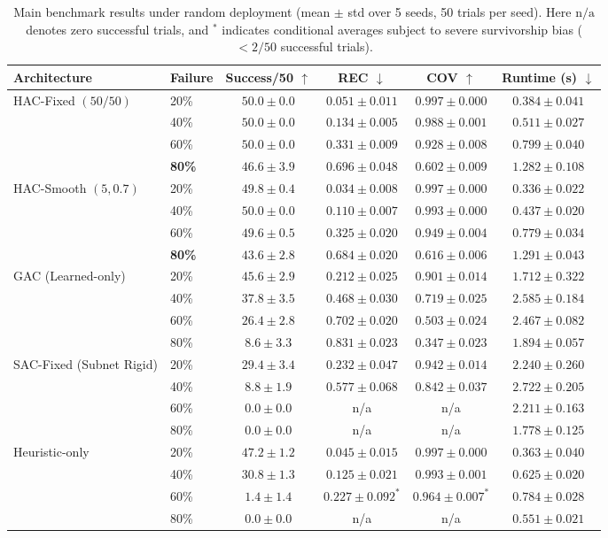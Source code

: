\documentclass[11pt]{article}
\theoremstyle{plain}
\theoremstyle{definition}
\theoremstyle{remark}
\begin{document}
\begin{table}[t]
\centering
\caption{Main benchmark results under random deployment (mean $\pm$ std over 5 seeds, 50 trials per seed). Here $\mathrm{n/a}$ denotes zero successful trials, and $^*$ indicates conditional averages subject to severe survivorship bias ($<2/50$ successful trials).}
\label{tab:main-random}
\scriptsize
\begin{tabular}{@{}llcccc@{}}
\toprule
Architecture & Failure & Success/50 $\uparrow$ & REC $\downarrow$ & COV $\uparrow$ & Runtime (s) $\downarrow$ \\
\midrule
\multirow{4}{*}{HAC-Fixed $(50/50)$}
 & 20\% & $50.0\pm0.0$ & $0.051\pm0.011$ & $0.997\pm0.000$ & $0.384\pm0.041$ \\
 & 40\% & $50.0\pm0.0$ & $0.134\pm0.005$ & $0.988\pm0.001$ & $0.511\pm0.027$ \\
 & 60\% & $50.0\pm0.0$ & $0.331\pm0.009$ & $0.928\pm0.008$ & $0.799\pm0.040$ \\
 & \textbf{80\%} & $\mathbf{46.6\pm3.9}$ & $0.696\pm0.048$ & $0.602\pm0.009$ & $\mathbf{1.282\pm0.108}$ \\
\midrule
\multirow{4}{*}{HAC-Smooth $(5, 0.7)$}
 & 20\% & $49.8\pm0.4$ & $0.034\pm0.008$ & $0.997\pm0.000$ & $0.336\pm0.022$ \\
 & 40\% & $50.0\pm0.0$ & $0.110\pm0.007$ & $0.993\pm0.000$ & $0.437\pm0.020$ \\
 & 60\% & $49.6\pm0.5$ & $0.325\pm0.020$ & $0.949\pm0.004$ & $0.779\pm0.034$ \\
 & \textbf{80\%} & $43.6\pm2.8$ & $\mathbf{0.684\pm0.020}$ & $\mathbf{0.616\pm0.006}$ & $1.291\pm0.043$ \\
\midrule
\multirow{4}{*}{GAC (Learned-only)}
 & 20\% & $45.6\pm2.9$ & $0.212\pm0.025$ & $0.901\pm0.014$ & $1.712\pm0.322$ \\
 & 40\% & $37.8\pm3.5$ & $0.468\pm0.030$ & $0.719\pm0.025$ & $2.585\pm0.184$ \\
 & 60\% & $26.4\pm2.8$ & $0.702\pm0.020$ & $0.503\pm0.024$ & $2.467\pm0.082$ \\
 & 80\% & $8.6\pm3.3$  & $0.831\pm0.023$ & $0.347\pm0.023$ & $1.894\pm0.057$ \\
\midrule
\multirow{4}{*}{SAC-Fixed (Subnet Rigid)}
 & 20\% & $29.4\pm3.4$ & $0.232\pm0.047$ & $0.942\pm0.014$ & $2.240\pm0.260$ \\
 & 40\% & $8.8\pm1.9$  & $0.577\pm0.068$ & $0.842\pm0.037$ & $2.722\pm0.205$ \\
 & 60\% & $0.0\pm0.0$  & n/a & n/a & $2.211\pm0.163$ \\
 & 80\% & $0.0\pm0.0$  & n/a & n/a & $1.778\pm0.125$ \\
\midrule
\multirow{4}{*}{Heuristic-only}
 & 20\% & $47.2\pm1.2$ & $0.045\pm0.015$ & $0.997\pm0.000$ & $0.363\pm0.040$ \\
 & 40\% & $30.8\pm1.3$ & $0.125\pm0.021$ & $0.993\pm0.001$ & $0.625\pm0.020$ \\
 & 60\% & $1.4\pm1.4$  & $0.227\pm0.092^*$ & $0.964\pm0.007^*$ & $0.784\pm0.028$ \\
 & 80\% & $0.0\pm0.0$  & n/a & n/a & $0.551\pm0.021$ \\
\bottomrule
\end{tabular}
\end{table}
\end{document}
